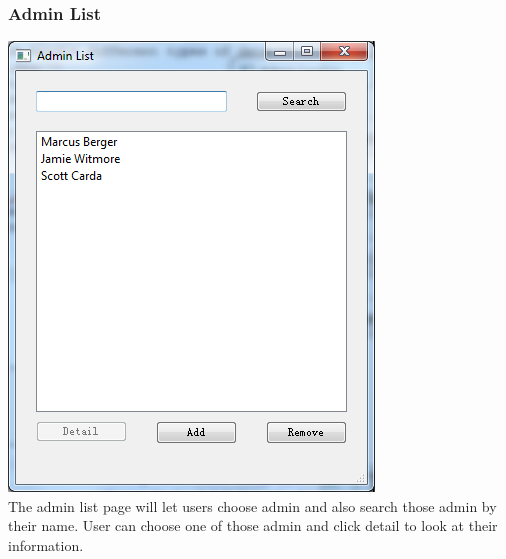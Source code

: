 \subsubsection{Admin List}
\includegraphics[scale=0.5]{pics/admin_list.png}\\
The admin list page will let users choose admin and also search those admin by their name. User can choose one of those admin and click detail to look at their information.\\

